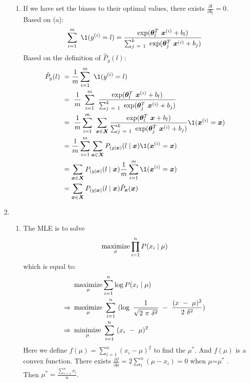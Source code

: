 \documentclass[a4paper]{article}
\begin{document}
\begin{enumerate}
\begin{enumerate}
  \item
  If we have set the biases to their optimal values, there exists $\frac{\partial l}{\partial b_l} = 0$.
  Based on (a):
  \begin{equation*}
    \sum_{i = 1}^m \1 (y^{(i)}=l) = \frac{\exp(\boldsymbol{\theta}^T_l \boldsymbol x^{(i)}+b_l)}{\sum_{j = 1}^k \exp(\boldsymbol{\theta}^T_j \boldsymbol x^{(i)}+b_j)}
  \end{equation*}
  Based on the definition of $\hat{P}_y (l)$:
  \begin{equation*}
    \begin{aligned}
    \hat{P}_y (l) 
    &= \frac{1}{m} \sum_{i = 1}^m \1 (y^{(i)}=l)\\
    &= \frac{1}{m} \sum_{i = 1}^m \frac{\exp(\boldsymbol{\theta}^T_l \boldsymbol x^{(i)}+b_l)}{\sum_{j = 1}^k \exp(\boldsymbol \theta^T_j \boldsymbol x^{(i)}+b_j)}\\
    &= \frac{1}{m} \sum_{i = 1}^m \sum_{\boldsymbol x \in \boldsymbol X} \frac{\exp(\boldsymbol \theta^T_l \boldsymbol x+b_l)}{\sum_{j = 1}^k \exp(\boldsymbol \theta^T_j \boldsymbol x^{(i)}+b_j)}\1 (\boldsymbol x^{(i)} = \boldsymbol x)\\
    &= \frac{1}{m} \sum_{i = 1}^m \sum_{\boldsymbol x \in \boldsymbol X} P_{(y \mid \boldsymbol x)} (l \mid \boldsymbol x) \1 (\boldsymbol x^{(i)} = \boldsymbol x)\\
    &= \sum_{\boldsymbol x \in \boldsymbol X} P_{(y \mid \boldsymbol x)} (l \mid \boldsymbol x) \frac{1}{m} \sum_{i = 1}^m \1 (\boldsymbol x^{(i)} = \boldsymbol x)\\
    &= \sum_{\boldsymbol x \in \boldsymbol X} P_{(y \mid \boldsymbol x)} (l \mid \boldsymbol x) \hat{P}_{\boldsymbol x} (\boldsymbol x) 
    \end{aligned}
  \end{equation*}
  \end{enumerate}  

\item
  \begin{enumerate}
  \item
    The MLE is to solve
    \begin{equation*}
      \operatorname*{maximize}_{\mu} \prod_{i=1}^n P(x_i \mid \mu)
    \end{equation*}
    which is equal to:
    \begin{equation*}
      \begin{aligned}
      &\maximize_{\mu} \sum_{i=1}^n \log P(x_i \mid \mu)\\
      \Rightarrow &\maximize_{\mu} \sum_{i=1}^n (\log \frac{1}{\sqrt{2 \pi \delta^2}} - \frac{(x - \mu)^2}{2 \delta^2})\\
      \Rightarrow &\minimize_{\mu} \sum_{i=1}^n (x_i - \mu)^2
      \end{aligned}
    \end{equation*}
    Here we define $f(\mu) = \sum_{i=1}^n (x_i - \mu)^2$ to find the $\mu^*$. And $f(\mu)$ is a convex function. There exists $\frac{\partial f}{\partial \mu} = 2\sum_i^n (\mu - x_i) = 0$ when $\mu$=$\mu^*$ .\\
    Then $\mu^* = \frac{\sum_{i=1}^n x_i}{n}$.


\end{enumerate}
\end{enumerate}
\end{document}
